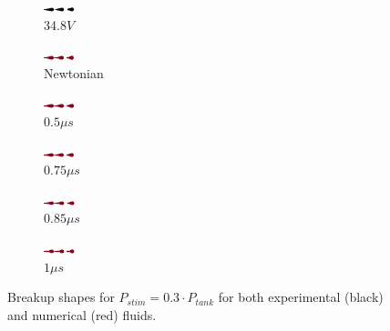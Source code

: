 \documentclass[twocolumn,10pt]{asme2ej}
\begin{document}
\begin{figure}[h]

    \begin{subfigure}[t]{1.2cm}
        \centering
        \includegraphics[angle=-90,origin=c,width=0.9cm]{Encre/exp_A3.png}        
        \caption{34.8$V$}
    \end{subfigure}
    \hfill
    \begin{subfigure}[t]{1.2cm}
        \centering
        \includegraphics[angle=-90,origin=c,width=0.9cm]{Encre/0_A3.png}

        \caption{Newtonian}
    \end{subfigure}
    \hfill
    \begin{subfigure}[t]{1.2cm}
        \centering
        \includegraphics[angle=-90,origin=c,width=0.9cm]{Encre/05_A3.png}
        \caption{$0.5\mu s$}
    \end{subfigure}\hfill
    \begin{subfigure}[t]{1.2cm}
        \centering
        \includegraphics[angle=-90,origin=c,width=0.9cm]{Encre/075_A3.png}
        \caption{$0.75\mu s$}
    \end{subfigure}
    \hfill
    \begin{subfigure}[t]{1.2cm}
        \centering
        \includegraphics[angle=-90,origin=c,width=0.9cm]{Encre/085_A3.png}
        \caption{$0.85\mu s$}
    \end{subfigure}
    \hfill
    \begin{subfigure}[t]{1.2cm}
        \centering
        \includegraphics[angle=-90,origin=c,width=0.9cm]{Encre/1_A3.png}
        \caption{$1\mu s$}
    \end{subfigure}
       \caption{Breakup shapes for $P_{stim}=0.3\cdot P_{tank}$ for both experimental (black) and numerical (red) fluids.}
       \label{fig:A3}
\end{figure}
\end{document}
